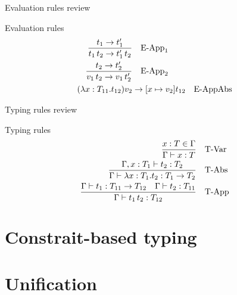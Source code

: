 \documentclass[8pt]{beamer}
\begin{document}
\begin{frame}{Evaluation rules review}
    \begin{block}{Evaluation rules}
        \begin{displaymath}
            \begin{split}
              {{t_{1} \rightarrow t_{1}^{\prime}}\over
                    {t_{1} \, t_{2} \rightarrow t_{1}^{\prime} \, t_{2}}} & \quad \text{E-App}_{1} \\
               {{t_{2} \rightarrow t_{2}^{\prime}}\over
                    {v_{1} \, t_{2} \rightarrow v_{1} \, t_{2}^{\prime}}} & \quad \text{E-App}_{2} \\
               (\lambda x:T_{11}.t_{12})v_{2} & \rightarrow [x \mapsto v_{2}]t_{12}  \quad \text{E-AppAbs} \\
            \end{split}
        \end{displaymath}
    \end{block}
\end{frame}

\begin{frame}{Typing rules review}
    \begin{block}{Typing rules}
        \begin{displaymath}
            \begin{split}
              {{x:T \in \Gamma}\over
                    {\Gamma \vdash x:T}} & \quad \text{T-Var} \\
              {{\Gamma, x:T_{1} \vdash t_{2}:T_{2}}\over
                    {\Gamma \vdash \lambda x:T_{1}.t_{2} : T_{1} \rightarrow T_{2}}} & \quad \text{T-Abs} \\
              {{\Gamma \vdash t_{1}:T_{11} \rightarrow T_{12} \quad \Gamma \vdash t_{2}:T_{11}}\over
                    {\Gamma \vdash t_{1} \, t_{2} : T_{12}}} & \quad \text{T-App} \\
            \end{split}
        \end{displaymath}
    \end{block}
\end{frame}

\section{Constrait-based typing}

\section{Unification}
\end{document}
